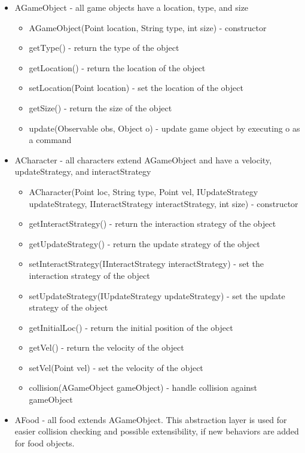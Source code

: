 \documentclass[letterpaper, 11pt]{article}
\begin{document}
\begin{itemize}
  \item AGameObject - all game objects have a location, type, and size
  \begin{itemize}
    \item AGameObject(Point location, String type, int size) - constructor
    \item getType() - return the type of the object
    \item getLocation() - return the location of the object
    \item setLocation(Point location) - set the location of the object
    \item getSize() - return the size of the object
    \item update(Observable obs, Object o) - update game object by executing o as a command
  \end{itemize}
  \item ACharacter - all characters extend AGameObject and have a velocity, updateStrategy, and interactStrategy
  \begin{itemize}
    \item ACharacter(Point loc, String type, Point vel, IUpdateStrategy updateStrategy, IInteractStrategy interactStrategy, int size) - constructor
    \item getInteractStrategy() - return the interaction strategy of the object
    \item getUpdateStrategy() - return the update strategy of the object
    \item setInteractStrategy(IInteractStrategy interactStrategy) - set the interaction strategy of the object
    \item setUpdateStrategy(IUpdateStrategy updateStrategy) - set the update strategy of the object
    \item getInitialLoc() - return the initial position of the object
    \item getVel() - return the velocity of the object
    \item setVel(Point vel) - set the velocity of the object
    \item collision(AGameObject gameObject) - handle collision against gameObject
  \end{itemize}
  \item AFood - all food extends AGameObject. This abstraction layer is used for easier collision checking and possible extensibility, if new behaviors are added for food objects.
  \begin{itemize}

\end{itemize}
\end{itemize}
\end{document}
